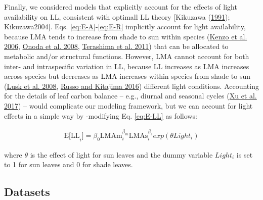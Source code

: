 \documentclass[
  12pt,
]{article}
\begin{document}
Finally, we considered models that explicitly account for the effects of light availability on LL, consistent with optimall LL theory {[}Kikuzawa (\protect\hyperlink{ref-Kikuzawa1991}{1991}); Kikuzawa2004{]}.
Eqs. \eqref{eq:E-A}-\eqref{eq:E-R} implicitly account for light availability, because LMA tends to increase from shade to sun within species (\protect\hyperlink{ref-Kenzo2006}{Kenzo et al. 2006}, \protect\hyperlink{ref-Onoda2008}{Onoda et al. 2008}, \protect\hyperlink{ref-Terashima2011}{Terashima et al. 2011}) that can be allocated to metabolic and/or structural functions.
However, LMA cannot account for both inter- and intraspecific variation in LL, because LL increases as LMA increases across species but decreases as LMA increases within species from shade to sun (\protect\hyperlink{ref-Lusk2008}{Lusk et al. 2008}, \protect\hyperlink{ref-Russo2016}{Russo and Kitajima 2016}) different light conditions.
Accounting for the details of leaf carbon balance -- e.g., diurnal and seasonal cycles (\protect\hyperlink{ref-Xu2017}{Xu et al. 2017}) -- would complicate our modeling framework, but we can account for light effects in a simple way by -modifying Eq. \eqref{eq:E-LL} as follows:

\begin{align}
\mathrm{E[LL}_i] = \beta_0\mathrm{LMAm}_{i}^{\beta_m} \mathrm{LMAs}_{i}^{\beta_s} exp(\theta Light_i) \label{eq:E-LL2}
\end{align}

where \(\theta\) is the effect of light for sun leaves and the dummy variable \(Light_i\) is set to 1 for sun leaves and 0 for shade leaves.

\hypertarget{datasets}{%
\subsection{Datasets}\label{datasets}}
\end{document}
